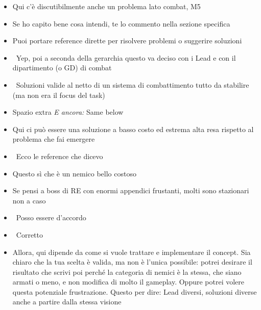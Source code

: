 {\begin{itemize}
  \item {} Qui c'è discutibilmente anche un problema lato combat, M5
  \item {} Se ho capito bene cosa intendi, te lo commento nella sezione specifica
  \item {} Puoi portare reference dirette per risolvere problemi o suggerire soluzioni
  \item {} \rvBene\ Yep, poi a seconda della gerarchia questo va deciso con i Lead e con il dipartimento (o GD) di combat
  \item {} \rvBene\ Soluzioni valide al netto di un sistema di combattimento tutto da stabilire (ma non era il focus del task)
  \item \rvVuoto Spazio extra \emph{E ancora:} Same below
  \item {} Qui ci può essere una soluzione a basso costo ed estrema alta resa rispetto al problema che fai emergere
  \item {} \rvBene\ Ecco le reference che dicevo
  \item {} Questo sì che è un nemico bello costoso
  \item {} Se pensi a boss di RE con enormi appendici frustanti, molti sono stazionari non a caso
  \item {} \rvBene\ Posso essere d'accordo
  \item {} \rvBene\ Corretto
  \item {} Allora, qui dipende da come si vuole trattare e implementare il concept. Sia chiaro che la tua scelta è valida, ma non è l'unica possibile: potrei desirare il risultato che scrivi poi perché la categoria di nemici è la stessa, che siano armati o meno, e non modifica di molto il gameplay. Oppure potrei volere questa potenziale frustrazione. Questo per dire: Lead diversi, soluzioni diverse anche a partire dalla stessa visione

\end{itemize}}
